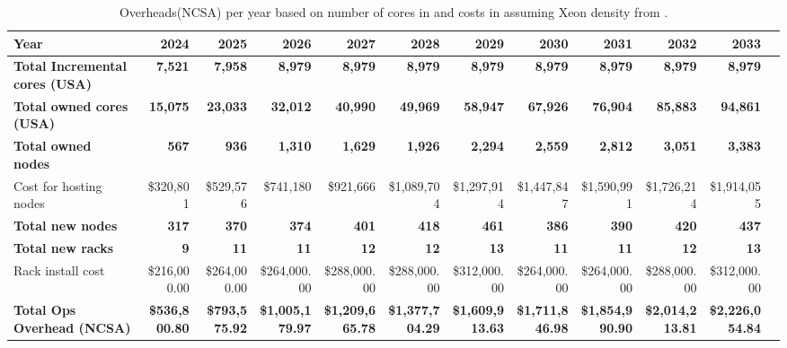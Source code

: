 \tiny \begin{longtable} { |p{}  |r  |r  |r  |r  |r  |r  |r  |r  |r  |r  |r |} 
\caption{Overheads(NCSA) per year based on number of cores in  and costs in  assuming Xeon density from .  \label{tab:opsOverheadCost}}\\ 
\hline 
\textbf{Year}&\textbf{2024}&\textbf{2025}&\textbf{2026}&\textbf{2027}&\textbf{2028}&\textbf{2029}&\textbf{2030}&\textbf{2031}&\textbf{2032}&\textbf{2033} \\ \hline
\textbf{Total Incremental cores (USA)}&\textbf{7,521}&\textbf{7,958}&\textbf{8,979}&\textbf{8,979}&\textbf{8,979}&\textbf{8,979}&\textbf{8,979}&\textbf{8,979}&\textbf{8,979}&\textbf{8,979} \\ \hline
\textbf{Total owned cores (USA)}&\textbf{15,075}&\textbf{23,033}&\textbf{32,012}&\textbf{40,990}&\textbf{49,969}&\textbf{58,947}&\textbf{67,926}&\textbf{76,904}&\textbf{85,883}&\textbf{94,861} \\ \hline
\textbf{Total owned nodes}&\textbf{567}&\textbf{936}&\textbf{1,310}&\textbf{1,629}&\textbf{1,926}&\textbf{2,294}&\textbf{2,559}&\textbf{2,812}&\textbf{3,051}&\textbf{3,383} \\ \hline
{Cost for hosting nodes}&{\$320,801}&{\$529,576}&{\$741,180}&{\$921,666}&{\$1,089,704}&{\$1,297,914}&{\$1,447,847}&{\$1,590,991}&{\$1,726,214}&{\$1,914,055} \\ \hline
\textbf{Total new nodes}&\textbf{317}&\textbf{370}&\textbf{374}&\textbf{401}&\textbf{418}&\textbf{461}&\textbf{386}&\textbf{390}&\textbf{420}&\textbf{437} \\ \hline
\textbf{Total new racks}&\textbf{9}&\textbf{11}&\textbf{11}&\textbf{12}&\textbf{12}&\textbf{13}&\textbf{11}&\textbf{11}&\textbf{12}&\textbf{13} \\ \hline
{Rack install cost }&{\$216,000.00}&{\$264,000.00}&{\$264,000.00}&{\$288,000.00}&{\$288,000.00}&{\$312,000.00}&{\$264,000.00}&{\$264,000.00}&{\$288,000.00}&{\$312,000.00} \\ \hline
\textbf{Total Ops Overhead (NCSA)}&\textbf{\$536,800.80}&\textbf{\$793,575.92}&\textbf{\$1,005,179.97}&\textbf{\$1,209,665.78}&\textbf{\$1,377,704.29}&\textbf{\$1,609,913.63}&\textbf{\$1,711,846.98}&\textbf{\$1,854,990.90}&\textbf{\$2,014,213.81}&\textbf{\$2,226,054.84} \\ \hline
\end{longtable} \normalsize
